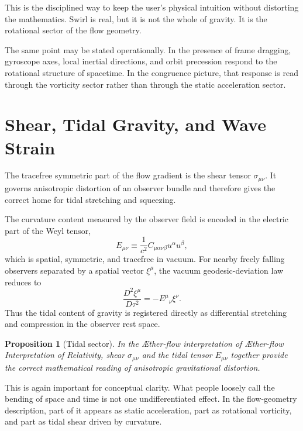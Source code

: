 \documentclass[11pt]{article}
\newcommand{\Aflow}{\AE{}ther-flow}
\newcommand{\TheoryName}{\Aflow{} Interpretation of Relativity}
\newtheorem{proposition}{Proposition}
\begin{document}
This is the disciplined way to keep the user's physical intuition without distorting the mathematics. Swirl is real, but it is not the whole of gravity. It is the rotational sector of the flow geometry.

The same point may be stated operationally. In the presence of frame dragging, gyroscope axes, local inertial directions, and orbit precession respond to the rotational structure of spacetime. In the congruence picture, that response is read through the vorticity sector rather than through the static acceleration sector.

\section{Shear, Tidal Gravity, and Wave Strain}

The tracefree symmetric part of the flow gradient is the shear tensor \(\sigma_{\mu\nu}\). It governs anisotropic distortion of an observer bundle and therefore gives the correct home for tidal stretching and squeezing.

The curvature content measured by the observer field is encoded in the electric part of the Weyl tensor,
\begin{equation}
E_{\mu\nu}
\equiv
\frac{1}{c^2}C_{\mu\alpha\nu\beta}u^\alpha u^\beta,
\label{eq:weylelectric}
\end{equation}
which is spatial, symmetric, and tracefree in vacuum. For nearby freely falling observers separated by a spatial vector \(\xi^\mu\), the vacuum geodesic-deviation law reduces to
\begin{equation}
\frac{D^2 \xi^\mu}{D\tau^2}
=
-E^\mu{}_{\nu}\xi^\nu.
\label{eq:geodesicdeviation}
\end{equation}
Thus the tidal content of gravity is registered directly as differential stretching and compression in the observer rest space.

\begin{proposition}[Tidal sector]
In the \Aflow{} interpretation of \TheoryName{}, shear \(\sigma_{\mu\nu}\) and the tidal tensor \(E_{\mu\nu}\) together provide the correct mathematical reading of anisotropic gravitational distortion.
\end{proposition}

This is again important for conceptual clarity. What people loosely call the bending of space and time is not one undifferentiated effect. In the flow-geometry description, part of it appears as static acceleration, part as rotational vorticity, and part as tidal shear driven by curvature.
\end{document}
